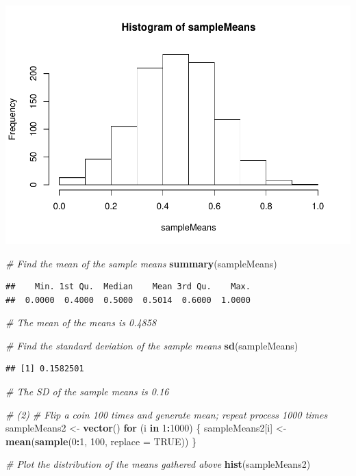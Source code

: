 \documentclass[]{article}
\newenvironment{Shaded}{\begin{snugshade}}{\end{snugshade}}
\newcommand{\KeywordTok}[1]{\textcolor[rgb]{0.13,0.29,0.53}{\textbf{#1}}}
\newcommand{\DataTypeTok}[1]{\textcolor[rgb]{0.13,0.29,0.53}{#1}}
\newcommand{\DecValTok}[1]{\textcolor[rgb]{0.00,0.00,0.81}{#1}}
\newcommand{\StringTok}[1]{\textcolor[rgb]{0.31,0.60,0.02}{#1}}
\newcommand{\CommentTok}[1]{\textcolor[rgb]{0.56,0.35,0.01}{\textit{#1}}}
\newcommand{\OtherTok}[1]{\textcolor[rgb]{0.56,0.35,0.01}{#1}}
\newcommand{\ControlFlowTok}[1]{\textcolor[rgb]{0.13,0.29,0.53}{\textbf{#1}}}
\newcommand{\OperatorTok}[1]{\textcolor[rgb]{0.81,0.36,0.00}{\textbf{#1}}}
\newcommand{\NormalTok}[1]{#1}
\begin{document}
\includegraphics{macroNoGiodP_files/figure-latex/unnamed-chunk-2-1.pdf}

\begin{Shaded}
\begin{Highlighting}[]
\CommentTok{# Find the mean of the sample means }
\KeywordTok{summary}\NormalTok{(sampleMeans)}
\end{Highlighting}
\end{Shaded}

\begin{verbatim}
##    Min. 1st Qu.  Median    Mean 3rd Qu.    Max. 
##  0.0000  0.4000  0.5000  0.5014  0.6000  1.0000
\end{verbatim}

\begin{Shaded}
\begin{Highlighting}[]
\CommentTok{# The mean of the means is 0.4858}

\CommentTok{# Find the standard deviation of the sample means }
\KeywordTok{sd}\NormalTok{(sampleMeans)}
\end{Highlighting}
\end{Shaded}

\begin{verbatim}
## [1] 0.1582501
\end{verbatim}

\begin{Shaded}
\begin{Highlighting}[]
\CommentTok{# The SD of the sample means is 0.16}

\CommentTok{# (2)}
\CommentTok{# Flip a coin 100 times and generate mean; repeat process 1000 times}
\NormalTok{sampleMeans2 <-}\StringTok{ }\KeywordTok{vector}\NormalTok{()}
\ControlFlowTok{for}\NormalTok{ (i }\ControlFlowTok{in} \DecValTok{1}\OperatorTok{:}\DecValTok{1000}\NormalTok{) \{ }
\NormalTok{  sampleMeans2[i] <-}\StringTok{ }\KeywordTok{mean}\NormalTok{(}\KeywordTok{sample}\NormalTok{(}\DecValTok{0}\OperatorTok{:}\DecValTok{1}\NormalTok{, }\DecValTok{100}\NormalTok{, }\DataTypeTok{replace =} \OtherTok{TRUE}\NormalTok{))}
\NormalTok{\}}

\CommentTok{# Plot the distribution of the means gathered above}
\KeywordTok{hist}\NormalTok{(sampleMeans2)}
\end{Highlighting}
\end{Shaded}
\end{document}
